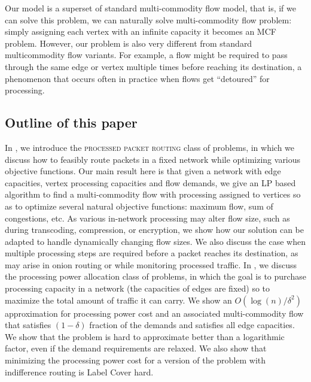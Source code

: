 Our model is a superset of standard multi-commodity flow model\cite{MCF}, that is, if we can solve this problem, we can naturally solve multi-commodity flow problem: simply assigning each vertex with an infinite capacity it becomes an MCF problem. However, our problem is also very different from standard multicommodity flow variants. For example, a flow might be required to pass through the same edge or vertex multiple times before reaching its destination, a phenomenon that occurs often in practice when flows get ``detoured'' for processing.\cite{SIMPLE2013}


\subsection{Outline of this paper}
In , we introduce the \textsc{processed packet routing} class of problems, in which we discuss how to feasibly route packets in a fixed network while optimizing various objective functions. Our main result here is that given a network with edge capacities, vertex processing capacities and flow demands, we give an LP based algorithm to find a multi-commodity flow with processing assigned to vertices so as to optimize several natural objective functions: maximum flow,  sum of congestions, etc.
As various in-network processing may alter flow size, such as during transcoding, compression, or encryption, we show how our solution can be adapted to handle dynamically changing flow sizes. We also discuss the case when multiple processing steps are required before a packet reaches its destination, as may arise in onion routing or while monitoring processed traffic. In , we discuss the {\sc processing power allocation} class of problems, in which the goal is to purchase processing capacity in a network (the capacities of edges are fixed) so to maximize the total amount of traffic it can carry. We show an $O(\log(n)/\delta^2)$ approximation for processing power cost and an associated multi-commodity flow that satisfies $(1-\delta)$ fraction of the demands and satisfies all edge capacities. We show that the problem is hard to approximate better than a logarithmic factor, even if the demand requirements are relaxed. We also show that minimizing the processing power cost for a version of the problem with indifference routing is {\sc Label Cover} hard.
